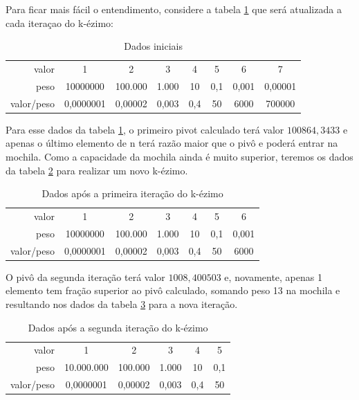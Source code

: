 \documentclass[
	12pt,				%
	oneside,			%
	a4paper,			%
	english,			%
	french,				%
	spanish,			%
	brazil,				%
	]{abntex2}
\begin{document}
Para ficar mais fácil o entendimento, considere a tabela \ref{inicio} que será atualizada a cada iteraçao do k-ézimo:

\begin{table}[!ht]
\centering
\begin{tabular}{r|c|c|c|c|c|c|c}
valor & 1 & 2 & 3 & 4 & 5 & 6 & 7 \\
peso & 10000000 & 100.000 & 1.000 & 10 & 0,1 & 0,001 & 0,00001 \\
valor/peso & 0,0000001 & 0,00002 & 0,003 & 0,4 & 50 & 6000 & 700000 \\
\end{tabular}
    \caption{Dados iniciais}
    \label{inicio}
\end{table}

Para esse dados da tabela \ref{inicio}, o primeiro pivot calculado terá valor $100864,3433$ e apenas o último elemento de n terá razão maior que o pivô e poderá entrar na mochila. Como a capacidade da mochila ainda é muito superior, teremos os dados da tabela \ref{iter1} para realizar um novo k-ézimo.

\begin{table}[!ht]
\centering
\begin{tabular}{r|c|c|c|c|c|c}
valor & 1 & 2 & 3 & 4 & 5 & 6 \\
peso & 10000000 & 100.000 & 1.000 & 10 & 0,1 & 0,001 \\
valor/peso & 0,0000001 & 0,00002 & 0,003 & 0,4 & 50 & 6000 \\
\end{tabular}
    \caption{Dados após a primeira iteração do k-ézimo}
    \label{iter1}
\end{table}

O pivô da segunda iteração terá valor $1008,400503$ e, novamente, apenas 1 elemento tem fração superior ao pivô calculado, somando peso 13 na mochila e resultando nos dados da tabela \ref{iter2} para a nova iteração.

\begin{table}[!ht]
\centering
\begin{tabular}{r|c|c|c|c|c}
valor & 1 & 2 & 3 & 4 & 5 \\
peso & 10.000.000 & 100.000 & 1.000 & 10 & 0,1 \\
valor/peso & 0,0000001 & 0,00002 & 0,003 & 0,4 & 50 \\
\end{tabular}
    \caption{Dados após a segunda iteração do k-ézimo}
    \label{iter2}
\end{table}
\end{document}
